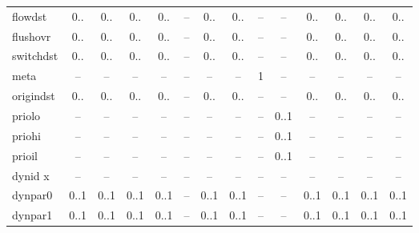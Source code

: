 \begin{table}
\begin{adjustwidth}{-21mm}{}
\begin{tabular}[t]{|L|c|c|c|c|c|c|c|c|c|c|c|c|c|}
flowdst           & 0..        & 0..             & 0..        & 0..        & --           & 0..        & 0..         & --        & --         & 0..              & 0..         & 0..        & 0..      \\
flushovr          & 0..        & 0..             & 0..        & 0..        & --           & 0..        & 0..         & --        & --         & 0..              & 0..         & 0..        & 0..      \\
switchdst         & 0..        & 0..             & 0..        & 0..        & --           & 0..        & 0..         & --        & --         & 0..              & 0..         & 0..        & 0..      \\
meta              & --         & --              & --         & --         & --           & --         & --          & 1         & --         & --               & --          & --         & --       \\
origindst         & 0..        & 0..             & 0..        & 0..        & --           & 0..        & 0..         & --        & --         & 0..              & 0..         & 0..        & 0..      \\
priolo            & --         & --              & --         & --         & --           & --         & --          & --        & 0..1       & --               & --          & --         & --       \\
priohi            & --         & --              & --         & --         & --           & --         & --          & --        & 0..1       & --               & --          & --         & --       \\
prioil            & --         & --              & --         & --         & --           & --         & --          & --        & 0..1       & --               & --          & --         & --       \\
dynid x           & --         & --              & --         & --         & --           & --         & --          & --        & --         & --               & --          & --         & --       \\
dynpar0           & 0..1       & 0..1            & 0..1       & 0..1       & --           & 0..1       & 0..1        & --        & --         & 0..1             & 0..1        & 0..1       & 0..1     \\
dynpar1           & 0..1       & 0..1            & 0..1       & 0..1       & --           & 0..1       & 0..1        & --        & --         & 0..1             & 0..1        & 0..1       & 0..1     \\

\end{tabular}
\end{adjustwidth}
\end{table}
